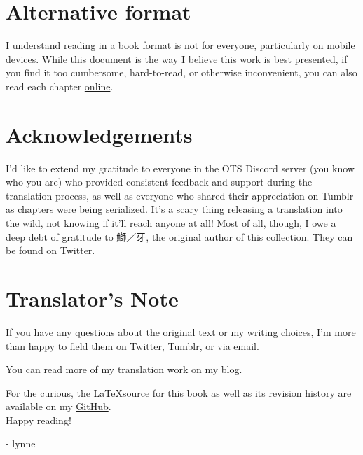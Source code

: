 \section*{Alternative format}
I understand reading in a book format is not for everyone, particularly on mobile devices. While this document is the way I believe this work is best presented, if you find it too cumbersome, hard-to-read, or otherwise inconvenient, you can also read each chapter \href{https://lynne.bearblog.dev/blog/?q=octo84}{online}.

\section*{Acknowledgements}
I'd like to extend my gratitude to everyone in the OTS Discord server (you know who you are) who provided consistent feedback and support during the translation process, as well as everyone who shared their appreciation on Tumblr as chapters were being serialized. It's a scary thing releasing a translation into the wild, not knowing if it'll reach anyone at all! Most of all, though, I owe a deep debt of gratitude to 鰤／牙, the original author of this collection. They can be found on \href{https://twitter.com/kiva_blitz}{Twitter}.

\section*{Translator's Note}
If you have any questions about the original text or my writing choices, I'm more than happy to field them on \href{https://twitter.com/plvpwaa}{Twitter}, \href{https://plvpwaa.tumblr.com}{Tumblr}, or via \href{mailto:plvpwaa@lynnux.org}{email}.

You can read more of my translation work on \href{https://lynne.bearblog.dev}{my blog}. 

For the curious, the \LaTeX \space source for this book as well as its revision history are available on my \href{https://github.com/Spirati/translation-octopath}{GitHub}.
\\

Happy reading!

- lynne